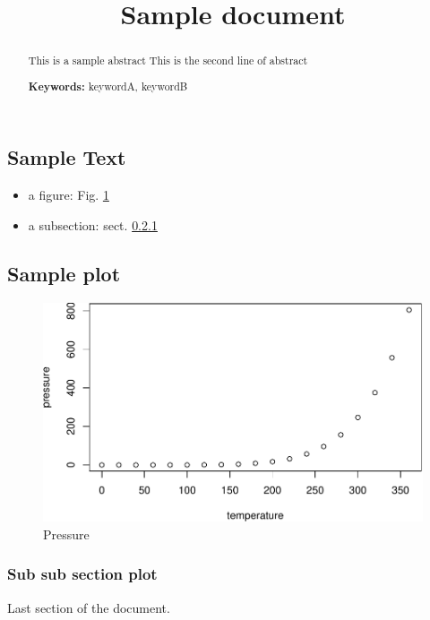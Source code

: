 \documentclass[]{elsarticle} %
\providecommand{\tightlist}{%
  \setlength{\itemsep}{0pt}\setlength{\parskip}{0pt}}
\begin{document}
\begin{frontmatter}

  \title{Sample document}
    \author[]{}
  
  
    
  \begin{abstract}
  This is a sample abstract \newline This is the second line of abstract
  \par \textbf{Keywords:} keywordA, keywordB
  \end{abstract}
  
 \end{frontmatter}

\subsection{Sample Text}\label{sample-text}

\begin{itemize}
\tightlist
\item
  a figure: Fig. \ref{fig:pressure}
\item
  a subsection: sect. \ref{sub-sub-section-plot}
\end{itemize}

\subsection{Sample plot}\label{sample-plot}

\begin{figure}

{\centering \includegraphics[width=0.5\linewidth]{refer_to_figure_and_subsection_pdf_book__baseRticles_files/figure-latex/pressure-1} 

}

\caption{Pressure}\label{fig:pressure}
\end{figure}

\subsubsection{Sub sub section plot}\label{sub-sub-section-plot}

Last section of the document.
\end{document}
